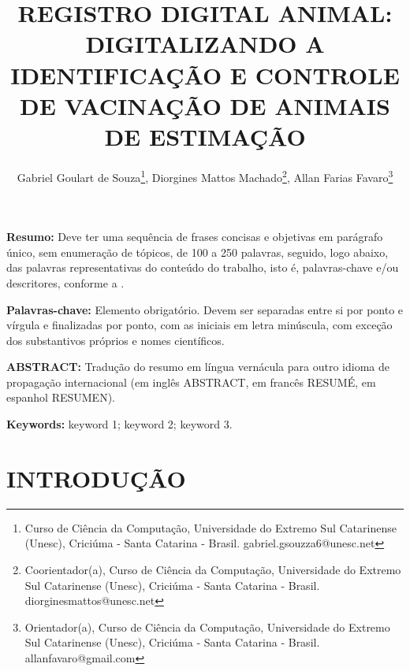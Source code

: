 \documentclass{UNESC}
\title{REGISTRO DIGITAL ANIMAL: DIGITALIZANDO A IDENTIFICAÇÃO E CONTROLE DE VACINAÇÃO DE ANIMAIS DE ESTIMAÇÃO}
\author
{
   Gabriel Goulart de Souza\footnote{Curso de Ciência da Computação, Universidade do Extremo Sul Catarinense (Unesc), Criciúma - Santa Catarina - Brasil. gabriel.gsouzza6@unesc.net},
   Diorgines Mattos Machado\footnote{Coorientador(a), Curso de Ciência da Computação, Universidade do Extremo Sul Catarinense (Unesc), Criciúma - Santa Catarina - Brasil. diorginesmattos@unesc.net},
   Allan Farias Favaro\footnote{Orientador(a), Curso de Ciência da Computação, Universidade do Extremo Sul Catarinense (Unesc), Criciúma - Santa Catarina - Brasil. allanfavaro@gmail.com}
}
\begin{document}
\onehalfspacing

\maketitle

\noindent
\textbf{Resumo:} Deve ter uma sequência de frases concisas e objetivas em parágrafo único, sem enumeração de tópicos, de 100 a 250 palavras, seguido, logo abaixo, das palavras representativas do conteúdo do trabalho, isto é, palavras-chave e/ou descritores, conforme a .

\vspace{0.5em}
\noindent
\textbf{Palavras-chave:} Elemento obrigatório. Devem ser separadas entre si por ponto e vírgula e finalizadas por ponto, com as iniciais em letra minúscula, com exceção dos substantivos próprios e nomes científicos. 

\vspace{1.0em}
\noindent
\textbf{ABSTRACT:} Tradução do resumo em língua vernácula para outro idioma de propagação internacional (em inglês ABSTRACT, em francês RESUMÉ, em espanhol RESUMEN).

\vspace{0.5em}
\noindent
\textbf{Keywords:} keyword 1; keyword 2; keyword 3.


\section{INTRODUÇÃO}




\end{document}
